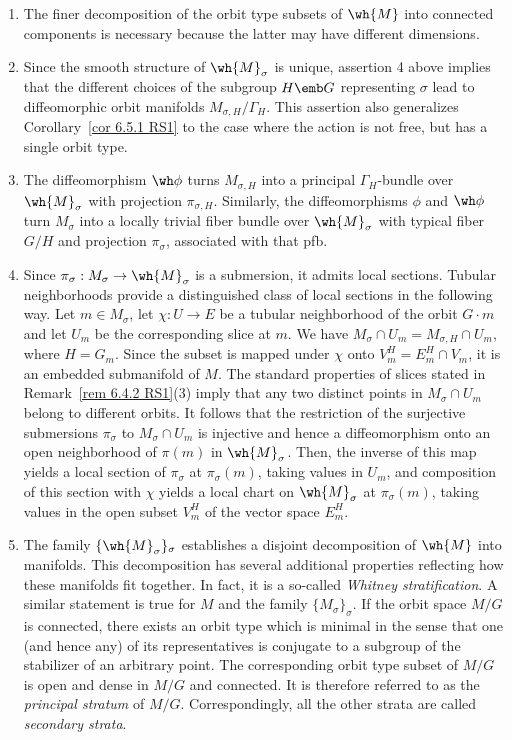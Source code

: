\begin{rem}[{{\cite[Rem.~6.6.2]{RS1}}}]
    \begin{enumerate}
        \item The finer decomposition of the orbit type subsets of $\wh{M}$ into connected components is necessary because the latter may have different dimensions.
        \item Since the smooth structure of $\wh{M}_\sigma$ is unique, assertion 4 above implies that the different choices of the subgroup $H\emb G$ representing $\sigma$ lead to diffeomorphic orbit manifolds $M_{\sigma,H}\slash\varGamma_H$. This assertion also generalizes Corollary~\ref{cor 6.5.1 RS1} to the case where the action is not free, but has a single orbit type.
        \item The diffeomorphism $\wh\phi$ turns $M_{\sigma,H}$ into a principal $\varGamma_H$-bundle over $\wh{M}_\sigma$ with projection $\pi_{\sigma,H}$. Similarly, the diffeomorphisms $\phi$ and $\wh\phi$ turn $M_\sigma$ into a locally trivial fiber bundle over $\wh{M}_\sigma$ with typical fiber $G\slash H$ and projection $\pi_\sigma$, associated with that \gls{pfb}.
        \item Since $\pi_\sigma:M_\sigma\to\wh{M}_\sigma$ is a submersion, it admits local sections. Tubular neighborhoods provide a distinguished class of local sections in the following way. Let $m\in M_\sigma$, let $\chi:U\to E$ be a tubular neighborhood of the orbit $G\cdot m$ and let $U_m$ be the corresponding slice at $m$. We have $M_\sigma\cap U_m=M_{\sigma,H}\cap U_m$, where $H=G_m$. Since the subset is mapped under $\chi$ onto $V_m^H=E_m^H\cap V_m$, it is an embedded submanifold of $M$. The standard properties of slices stated in Remark~\ref{rem 6.4.2 RS1}(3) imply that any two distinct points in $M_\sigma\cap U_m$ belong to different orbits. It follows that the restriction of the surjective submersions $\pi_\sigma$ to $M_\sigma\cap U_m$ is injective and hence a diffeomorphism onto an open neighborhood of $\pi(m)$ in $\wh{M}_\sigma$. Then, the inverse of this map yields a local section of $\pi_\sigma$ at $\pi_\sigma(m)$, taking values in $U_m$, and composition of this section with $\chi$ yields a local chart on $\wh{M}_\sigma$ at $\pi_\sigma(m)$, taking values in the open subset $V^H_m$ of the vector space $E_m^H$.
        \item The family $\{\wh{M}_\sigma\}_\sigma$ establishes a disjoint decomposition of $\wh{M}$ into manifolds. This decomposition has several additional properties reflecting how these manifolds fit together. In fact, it is a so-called \emph{Whitney stratification}. A similar statement is true for $M$ and the family $\{M_\sigma\}_\sigma$. If the orbit space $M\slash G$ is connected, there exists an orbit type which is minimal in the sense that one (and hence any) of its representatives is conjugate  to a subgroup of the stabilizer of an arbitrary point. The corresponding orbit type subset of $M\slash G$ is open and dense in $M\slash G$ and connected. It is therefore referred to as the \emph{principal stratum} of $M\slash G$. Correspondingly, all the other strata are called \emph{secondary strata}.
    \end{enumerate}
\end{rem}

